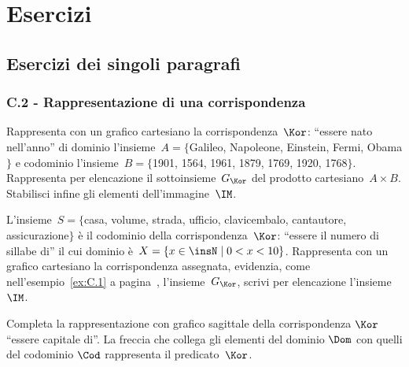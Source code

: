 
\section{Esercizi}

\subsection{Esercizi dei singoli paragrafi}

\subsubsection*{C.2 - Rappresentazione di una corrispondenza}

\begin{esercizio}
\label{ese:C.1}
Rappresenta con un grafico cartesiano la corrispondenza~$\Kor$: ``essere nato nell'anno'' di dominio l'insieme~$A=\{$Galileo, Napoleone, Einstein, Fermi, Obama$\}$
e codominio l'insieme~$B=\{$1901, 1564, 1961, 1879, 1769, 1920, 1768$\}$. Rappresenta per elencazione il sottoinsieme~$G_\Kor$ del prodotto cartesiano~$A \times B$.
Stabilisci infine gli elementi dell'immagine~$\IM$.
\end{esercizio}

\begin{esercizio}
\label{ese:C.2}
L'insieme~$S=\{$casa, volume, strada, ufficio, clavicembalo, cantautore, assicurazione$\}$ è il codominio della corrispondenza~$\Kor$: ``essere il numero di sillabe di'' il cui dominio
è~$X=\{x \in\insN \mid  0<x<10\}$. Rappresenta con un grafico cartesiano la corrispondenza assegnata, evidenzia, come nell'esempio~\ref{ex:C.1} a pagina~\pageref{ex:C.1}, l'insieme~$G_\Kor$,
scrivi per elencazione l'insieme~$\IM$.
\end{esercizio}

\begin{esercizio}
\label{ese:C.3}
Completa la rappresentazione con grafico sagittale della corrispondenza $\Kor$ ``essere capitale di''. La freccia che collega gli elementi del dominio $\Dom$ con quelli del codominio $\Cod$ rappresenta
il predicato~$\Kor$.
\begin{center}
 
\end{center}

\end{esercizio}

